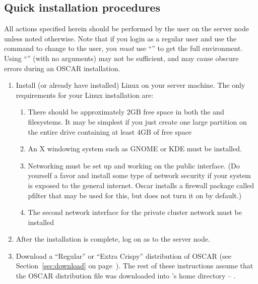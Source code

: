 
\subsection{Quick installation procedures}

All actions specified herein should be performed by the 
user on the server node unless noted otherwise.  Note that if you
login as a regular user and use the  command to change to the
 user, you {\em must} use ``'' to get the full
 environment.  Using ``'' (with no arguments) may
not be sufficient, and may cause obscure errors during an OSCAR
installation.

\begin {enumerate}
\item Install (or already have installed) Linux on your server
  machine.  The only requirements for your Linux installation are:

  \begin{enumerate}
  \item There should be approximately 2GB free space in both the
    \file{/} and  filesystems. It may be simplest if you
    just create one large partition on the entire drive containing at
    least 4GB of free space
    
  \item An X windowing system such as GNOME or KDE must be installed.
  \item Networking must be set up and working on the public interface.
    (Do yourself a favor and install some type of network security
    if your system is exposed to the general internet. Oscar installs
    a firewall package called pfilter that may be used for this,
    but does not turn it on by default.)
  \item The second network interface for the private cluster network
    must be installed
  \end{enumerate}
  
  
\item After the installation is complete, log on as  to the
  server node.
  
\item Download a ``Regular'' or ``Extra Crispy'' distribution of OSCAR
  (see Section~\ref{sec:download} on page~\pageref{sec:download}).
  The rest of these instructions assume that the OSCAR distribution
  file was downloaded into 's home directory --
  .


\end{enumerate}
